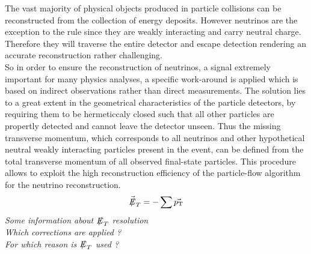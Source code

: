 The vast majority of physical objects produced in particle collisions can be reconstructed from the collection of energy deposits. 
However neutrinos are the exception to the rule since they are weakly interacting and carry neutral charge. Therefore they will traverse the entire detector and escape detection rendering an accurate reconstruction rather challenging.
\\
So in order to ensure the reconstruction of neutrinos, a signal extremely important for many physics analyses, a specific work-around is applied which is based on indirect observations rather than direct measurements. The solution lies to a great extent in the geometrical characteristics of the particle detectors, by requiring them to be hermeticcaly closed such that all other particles are propertly detected and cannot leave the detector unseen.
Thus the missing transverse momentum, which corresponds to all neutrinos and other hypothetical neutral weakly interacting particles present in the event, can be defined from the total transverse momentum of all observed final-state particles. This procedure allows to exploit the high reconstruction efficiency of the particle-flow algorithm for the neutrino reconstruction.
\begin{equation}
 \vecmet = - \sum \vec{\pT}
\end{equation}
\textit{Some information about $\met$ resolution}\\
\textit{Which corrections are applied ?}\\
\textit{For which reason is $\met$ used ?}
